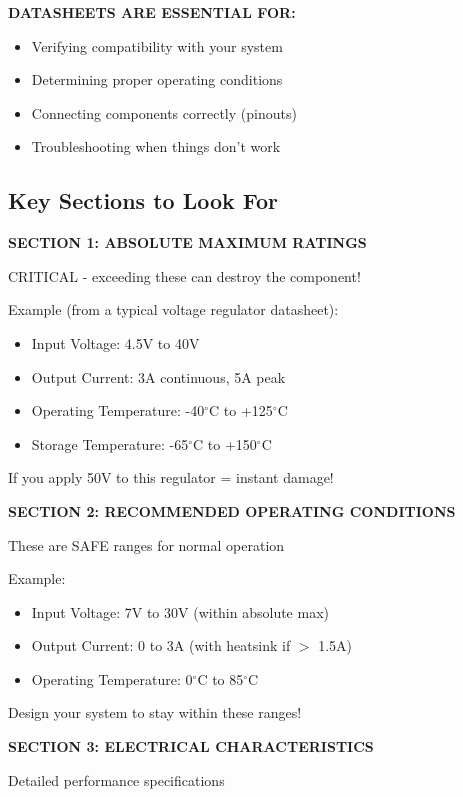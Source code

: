 \documentclass[11pt,letterpaper]{article}
\begin{document}
\textbf{DATASHEETS ARE ESSENTIAL FOR:}
\begin{itemize}
\item Verifying compatibility with your system
\item Determining proper operating conditions
\item Connecting components correctly (pinouts)
\item Troubleshooting when things don't work
\end{itemize}

\subsection{Key Sections to Look For}

\textbf{SECTION 1: ABSOLUTE MAXIMUM RATINGS}

\begin{warningbox}
CRITICAL - exceeding these can destroy the component!

Example (from a typical voltage regulator datasheet):
\begin{itemize}[nosep]
\item Input Voltage: 4.5V to 40V
\item Output Current: 3A continuous, 5A peak
\item Operating Temperature: -40$^\circ$C to +125$^\circ$C
\item Storage Temperature: -65$^\circ$C to +150$^\circ$C
\end{itemize}

If you apply 50V to this regulator = instant damage!
\end{warningbox}

\textbf{SECTION 2: RECOMMENDED OPERATING CONDITIONS}

These are SAFE ranges for normal operation

Example:
\begin{itemize}
\item Input Voltage: 7V to 30V (within absolute max)
\item Output Current: 0 to 3A (with heatsink if $>$ 1.5A)
\item Operating Temperature: 0$^\circ$C to 85$^\circ$C
\end{itemize}

Design your system to stay within these ranges!

\textbf{SECTION 3: ELECTRICAL CHARACTERISTICS}

Detailed performance specifications
\end{document}
